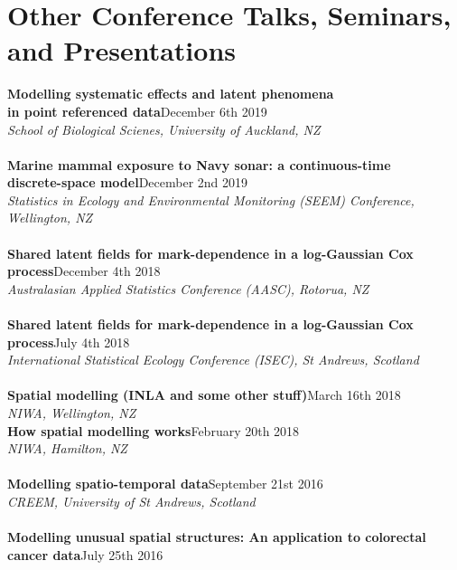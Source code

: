 \documentclass[10pt,letter]{article}
\begin{document}
\section*{Other Conference Talks, Seminars, and Presentations}
\vspace{1mm}
{\textbf{Modelling systematic effects and latent phenomena \\ in point referenced data}}\hfill December 6th 2019\\
 {\sl School of Biological Scienes, University of Auckland, NZ}\\
\hdashrule[0.5ex]{4cm}{1pt}{1pt}\\
{\textbf{Marine mammal exposure to Navy sonar: a continuous-time \\ discrete-space model}}\hfill December 2nd 2019\\
 {\sl Statistics in Ecology and Environmental Monitoring (SEEM) Conference, Wellington, NZ}\\
\hdashrule[0.5ex]{4cm}{1pt}{1pt}\\
{\textbf{Shared latent fields for mark-dependence in a log-Gaussian Cox process}}\hfill December 4th 2018\\
 {\sl Australasian Applied Statistics Conference (AASC), Rotorua, NZ}\\
\hdashrule[0.5ex]{4cm}{1pt}{1pt}\\
{\textbf{Shared latent fields for mark-dependence in a log-Gaussian Cox process}}\hfill July 4th 2018\\
 {\sl International Statistical Ecology Conference (ISEC), St Andrews, Scotland}\\
\hdashrule[0.5ex]{4cm}{1pt}{1pt}\\
{\textbf{Spatial modelling (INLA and some other stuff)}}\hfill March 16th 2018\\
 {\sl NIWA, Wellington, NZ}\\
 \newpage
 \noindent
{\textbf{How spatial modelling works}}\hfill February 20th 2018\\
 {\sl NIWA, Hamilton, NZ}\\
\hdashrule[0.5ex]{4cm}{1pt}{1pt}\\
{\textbf{Modelling spatio-temporal data}}\hfill September 21st 2016\\
 {\sl CREEM, University of St Andrews, Scotland}\\
\hdashrule[0.5ex]{4cm}{1pt}{1pt}\\
{\textbf{Modelling unusual spatial structures: An application to colorectal cancer data}}\hfill July 25th 2016\\
\end{document}
